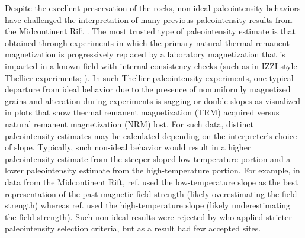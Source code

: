 \documentclass[9pt,twocolumn,twoside,lineno]{pnas-new}
\begin{document}
Despite the excellent preservation of the rocks, non-ideal paleointensity behaviors have challenged the interpretation of many previous paleointensity results from the Midcontinent Rift \cite{Pesonen1983a, Kulakov2013a, Sprain2018a}. The most trusted type of paleointensity estimate is that obtained through experiments in which the primary natural thermal remanent magnetization is progressively replaced by a laboratory magnetization that is imparted in a known field with internal consistency checks (such as in IZZI-style Thellier experiments;  \citealp{Yu2004a}). In such Thellier paleointensity experiments, one typical departure from ideal behavior due to the presence of nonuniformly magnetized grains and alteration during experiments is sagging or double-slopes as visualized in plots that show thermal remanent magnetization (TRM) acquired versus natural remanent magnetization (NRM) lost. For such data, distinct paleointensity estimates may be calculated depending on the interpreter's choice of slope. Typically, such non-ideal behavior would result in a higher paleointensity estimate from the steeper-sloped low-temperature portion and a lower paleointensity estimate from the high-temperature portion. For example, in data from the Midcontinent Rift, ref. \citealp{Pesonen1983a} used the low-temperature slope as the best representation of the past magnetic field strength (likely overestimating the field strength) whereas ref. \citealp{Kulakov2013a} used the high-temperature slope (likely underestimating the field strength). Such non-ideal results were rejected by \citealp{Sprain2018a} who applied stricter paleointensity selection criteria, but as a result had few accepted sites.
\end{document}
